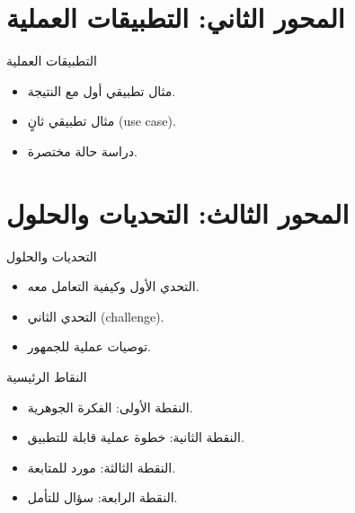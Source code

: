 \documentclass[aspectratio=169,11pt]{beamer}
\let\textEN\textenglish
\begin{document}
\section{المحور الثاني: التطبيقات العملية}
\begin{frame}{التطبيقات العملية}
\begin{itemize}
  \item مثال تطبيقي أول مع النتيجة.
  \item مثال تطبيقي ثانٍ \textEN{(use case)}.
  \item دراسة حالة مختصرة.
\end{itemize}
\end{frame}

\section{المحور الثالث: التحديات والحلول}
\begin{frame}{التحديات والحلول}
\begin{itemize}
  \item التحدي الأول وكيفية التعامل معه.
  \item التحدي الثاني \textEN{(challenge)}.
  \item توصيات عملية للجمهور.
\end{itemize}
\end{frame}

\begin{frame}{النقاط الرئيسية}
\begin{itemize}
  \item النقطة الأولى: الفكرة الجوهرية.
  \item النقطة الثانية: خطوة عملية قابلة للتطبيق.
  \item النقطة الثالثة: مورد للمتابعة.
  \item النقطة الرابعة: سؤال للتأمل.
\end{itemize}
\end{frame}
\end{document}
